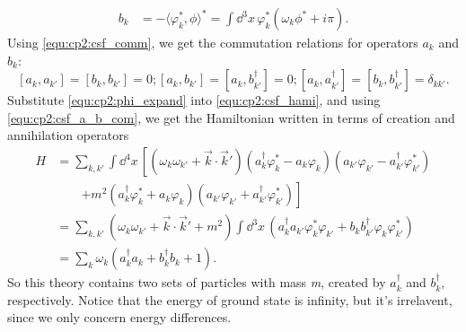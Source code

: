 \begin{problembody}
\begin{subequations}
\begin{align}
            b_k & = -\langle \varphi^\ast_k, \phi \rangle^\ast = \int \dd^3x \, \varphi^\ast_k \left(\omega_k\phi^\ast + i\pi\right).
        \end{align}
    \end{subequations}
    Using \eqref{equ:cp2:csf_comm}, we get the commutation relations for operators $a_k$ and $b_k$:
    \begin{subequations}\label{equ:cp2:csf_a_b_com}
        \begin{equation}
            [a_k,a_{k'}] = [b_k, b_{k'}] = 0;
        \end{equation}
        \begin{equation}
            [a_k,b_{k'}] = [a_k, b_{k'}^\dagger] = 0;
        \end{equation}
        \begin{equation}
            [a_k, a_{k'}^\dagger] = [b_k, b_{k'}^\dagger] = \delta_{kk'}.
        \end{equation}
    \end{subequations}
    Substitute \eqref{equ:cp2:phi_expand} into \eqref{equ:cp2:csf_hami}, and using \eqref{equ:cp2:csf_a_b_com}, we get the 
    Hamiltonian written in terms of creation and annihilation operators
    \begin{align}\label{equ:cp2:csf_hami_diag}
        H & = \sum_{k, k'} \int \dd^4x \, \left[
            \left(\omega_k\omega_{k'} + \vec{k}\cdot\vec{k}'\right) 
            \left(a_k^\dagger\varphi_k^\ast - a_k \varphi_k\right)
            \left(a_{k'}\varphi_{k'} - a_{k'}^\dagger\varphi_{k'}^\ast\right)\right.\nonumber\\
            & \qquad \left. + m^2 \left(a_k^\dagger\varphi_k^\ast + a_k\varphi_k\right)
            \left(a_{k'}\varphi_{k'} + a_{k'}^\dagger\varphi_{k'}^\ast\right)
        \right]\\
        & = \sum_{k, k'}\left(\omega_k\omega_{k'} + \vec{k}\cdot\vec{k}' + m^2\right)
        \int \dd^3x \, \left(a^\dagger_k a_{k'} \varphi^\ast_k \varphi_{k'} + b_k b^\dagger_{k'} \varphi_k \varphi^\ast_{k'}\right)\nonumber\\
        & = \sum_k \omega_k \left(a^\dagger_k a_k + b^\dagger_k b_k + 1\right).
    \end{align}
    So this theory contains two sets of particles with mass \textit{m}, created by $a^\dagger_k$ and $b^\dagger_k$, respectively.
    Notice that the energy of ground state is infinity, but it's irrelavent, since we only concern energy differences.


\end{problembody}
